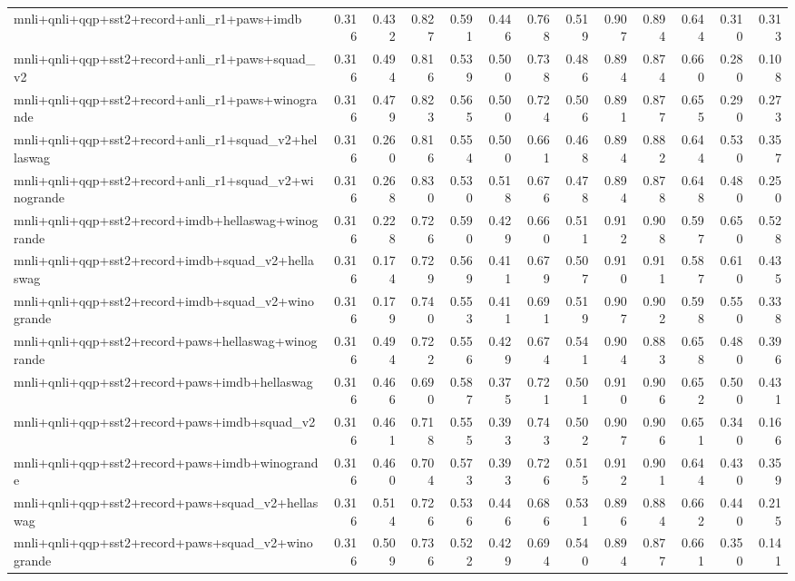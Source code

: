 \begin{table}[t]
\begin{tabular}{lrrrrrrrrrrrr}
    mnli+qnli+qqp+sst2+record+anli\_r1+paws+imdb & 0.316 & 0.432 & 0.827 & 0.591 & 0.446 & 0.768 & 0.519 & 0.907 & 0.894 & 0.644 & 0.310 & 0.313 \\
    mnli+qnli+qqp+sst2+record+anli\_r1+paws+squad\_v2 & 0.316 & 0.494 & 0.816 & 0.539 & 0.500 & 0.738 & 0.486 & 0.894 & 0.874 & 0.660 & 0.280 & 0.108 \\
    mnli+qnli+qqp+sst2+record+anli\_r1+paws+winogrande & 0.316 & 0.479 & 0.823 & 0.565 & 0.500 & 0.724 & 0.506 & 0.891 & 0.877 & 0.655 & 0.290 & 0.273 \\
    mnli+qnli+qqp+sst2+record+anli\_r1+squad\_v2+hellaswag & 0.316 & 0.260 & 0.816 & 0.554 & 0.500 & 0.661 & 0.468 & 0.894 & 0.882 & 0.644 & 0.530 & 0.357 \\
    mnli+qnli+qqp+sst2+record+anli\_r1+squad\_v2+winogrande & 0.316 & 0.268 & 0.830 & 0.530 & 0.518 & 0.676 & 0.478 & 0.894 & 0.878 & 0.648 & 0.480 & 0.250 \\
    mnli+qnli+qqp+sst2+record+imdb+hellaswag+winogrande & 0.316 & 0.228 & 0.726 & 0.590 & 0.429 & 0.660 & 0.511 & 0.912 & 0.908 & 0.597 & 0.650 & 0.528 \\
    mnli+qnli+qqp+sst2+record+imdb+squad\_v2+hellaswag & 0.316 & 0.174 & 0.729 & 0.569 & 0.411 & 0.679 & 0.507 & 0.910 & 0.911 & 0.587 & 0.610 & 0.435 \\
    mnli+qnli+qqp+sst2+record+imdb+squad\_v2+winogrande & 0.316 & 0.179 & 0.740 & 0.553 & 0.411 & 0.691 & 0.519 & 0.907 & 0.902 & 0.598 & 0.550 & 0.338 \\
    mnli+qnli+qqp+sst2+record+paws+hellaswag+winogrande & 0.316 & 0.494 & 0.722 & 0.556 & 0.429 & 0.674 & 0.541 & 0.904 & 0.883 & 0.658 & 0.480 & 0.396 \\
    mnli+qnli+qqp+sst2+record+paws+imdb+hellaswag & 0.316 & 0.466 & 0.690 & 0.587 & 0.375 & 0.721 & 0.501 & 0.910 & 0.906 & 0.652 & 0.500 & 0.431 \\
    mnli+qnli+qqp+sst2+record+paws+imdb+squad\_v2 & 0.316 & 0.461 & 0.718 & 0.555 & 0.393 & 0.743 & 0.502 & 0.907 & 0.906 & 0.651 & 0.340 & 0.166 \\
    mnli+qnli+qqp+sst2+record+paws+imdb+winogrande & 0.316 & 0.460 & 0.704 & 0.573 & 0.393 & 0.726 & 0.515 & 0.912 & 0.901 & 0.644 & 0.430 & 0.359 \\
    mnli+qnli+qqp+sst2+record+paws+squad\_v2+hellaswag & 0.316 & 0.514 & 0.726 & 0.536 & 0.446 & 0.686 & 0.531 & 0.896 & 0.884 & 0.662 & 0.440 & 0.215 \\
    mnli+qnli+qqp+sst2+record+paws+squad\_v2+winogrande & 0.316 & 0.509 & 0.736 & 0.522 & 0.429 & 0.694 & 0.540 & 0.894 & 0.877 & 0.661 & 0.350 & 0.141 \\

\end{tabular}
\end{table}
